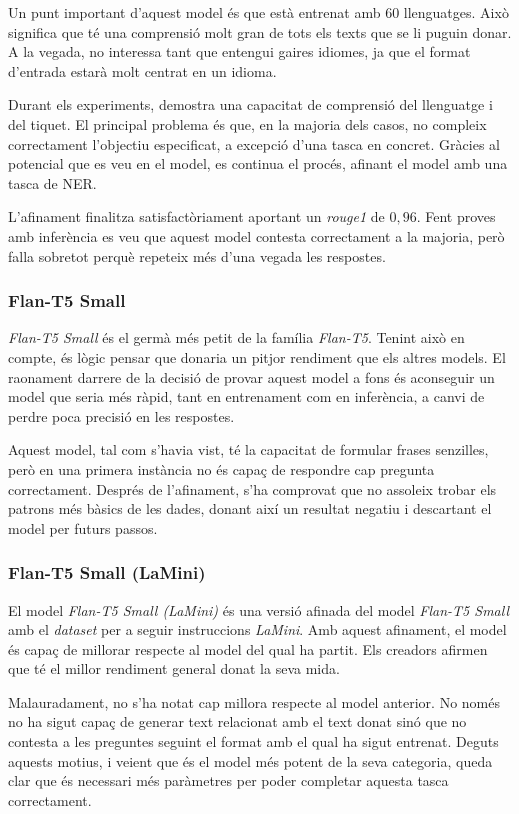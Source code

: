 Un punt important d'aquest model és que està entrenat amb 60 llenguatges. Això significa que té una comprensió molt gran de tots els texts que se li puguin donar. A la vegada, no interessa tant que entengui gaires idiomes, ja que el format d'entrada estarà molt centrat en un idioma.

Durant els experiments, demostra una capacitat de comprensió del llenguatge i del tiquet. El principal problema és que, en la majoria dels casos, no compleix correctament l'objectiu especificat, a excepció d'una tasca en concret. Gràcies al potencial que es veu en el model, es continua el procés, afinant el model amb una tasca de NER.

L'afinament finalitza satisfactòriament aportant un \textit{rouge1} de $0,96$. Fent proves amb inferència es veu que aquest model contesta correctament a la majoria, però falla sobretot perquè repeteix més d'una vegada les respostes.

\subsubsection{Flan-T5 Small}
\textit{Flan-T5 Small} \cite{flan-t5} és el germà més petit de la família \textit{Flan-T5}. Tenint això en compte, és lògic pensar que donaria un pitjor rendiment que els altres models. El raonament darrere de la decisió de provar aquest model a fons és aconseguir un model que seria més ràpid, tant en entrenament com en inferència, a canvi de perdre poca precisió en les respostes.

Aquest model, tal com s'havia vist, té la capacitat de formular frases senzilles, però en una primera instància no és capaç de respondre cap pregunta correctament. Després de l'afinament, s'ha comprovat que no assoleix trobar els patrons més bàsics de les dades, donant així un resultat negatiu i descartant el model per futurs passos.

\subsubsection{Flan-T5 Small (LaMini)}
El model \textit{Flan-T5 Small (LaMini)} \cite{flan-t5} \cite{lamini} és una versió afinada del model \textit{Flan-T5 Small} amb el \textit{dataset} per a seguir instruccions \textit{LaMini}. Amb aquest afinament, el model és capaç de millorar respecte al model del qual ha partit. Els creadors afirmen que té el millor rendiment general donat la seva mida.

Malauradament, no s'ha notat cap millora respecte al model anterior. No només no ha sigut capaç de generar text relacionat amb el text donat sinó que no contesta a les preguntes seguint el format amb el qual ha sigut entrenat. Deguts aquests motius, i veient que és el model més potent de la seva categoria, queda clar que és necessari més paràmetres per poder completar aquesta tasca correctament.

